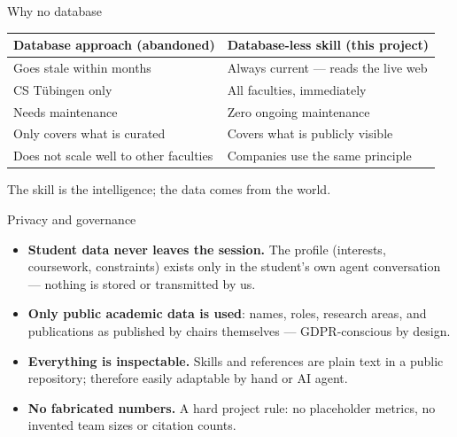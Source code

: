 \documentclass[11pt,aspectratio=169]{beamer}
\begin{document}
\begin{frame}{Why no database}
  \renewcommand{\arraystretch}{1.3}
  \small
  \begin{center}
  \begin{tabular}{@{}p{}p{}@{}}
    \toprule
    \textbf{Database approach (abandoned)} & \textbf{Database-less skill (this project)} \\
    \midrule
    Goes stale within months               & Always current --- reads the live web \\
    CS Tübingen only                       & All faculties, immediately \\
    Needs maintenance                      & Zero ongoing maintenance \\
    Only covers what is curated            & Covers what is publicly visible \\
    Does not scale well to other faculties & Companies use the same principle \\
    \bottomrule
  \end{tabular}
  \end{center}
  \vspace{0.8em}
  \begin{center}
    \alert{The skill is the intelligence; the data comes from the world.}\\

  \end{center}
\end{frame}

\begin{frame}{Privacy and governance}
  \begin{itemize}
    \item \textbf{Student data never leaves the session.} The profile
      (interests, coursework, constraints) exists only in the student's own
      agent conversation --- nothing is stored or transmitted by us.
    \item \textbf{Only public academic data is used}: names, roles, research
      areas, and publications as published by chairs themselves ---
      GDPR-conscious by design.
    \item \textbf{Everything is inspectable.} Skills and references are plain
      text in a public repository; therefore easily adaptable by hand or AI agent.
    \item \textbf{No fabricated numbers.} A hard project rule: no placeholder
      metrics, no invented team sizes or citation counts.
  \end{itemize}
\end{frame}
\end{document}

